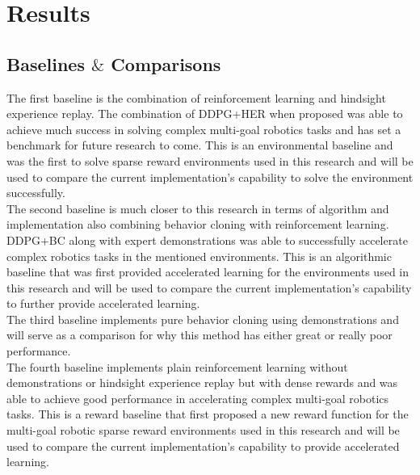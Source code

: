 \section{Results}

\subsection{Baselines $\&$ Comparisons}

The first baseline is the combination of reinforcement learning and hindsight experience replay. The combination of DDPG+HER when proposed was able to achieve much success in solving complex multi-goal robotics tasks and has set a benchmark for future research to come. This is an environmental baseline and was the first to solve sparse reward environments used in this research and will be used to compare the current implementation's capability to solve the environment successfully. \\

The second baseline is much closer to this research in terms of algorithm and implementation also combining behavior cloning with reinforcement learning. DDPG+BC along with expert demonstrations was able to successfully accelerate complex robotics tasks in the mentioned environments. This is an algorithmic baseline that was first provided accelerated learning for the environments used in this research and will be used to compare the current implementation's capability to further provide accelerated learning. \\

The third baseline implements pure behavior cloning using demonstrations and will serve as a comparison for why this method has either great or really poor performance. \\

The fourth baseline implements plain reinforcement learning without demonstrations or hindsight experience replay but with dense rewards and was able to achieve good performance in accelerating complex multi-goal robotics tasks. This is a reward baseline that first proposed a new reward function for the multi-goal robotic sparse reward environments used in this research and will be used to compare the current implementation's capability to provide accelerated learning. \\


